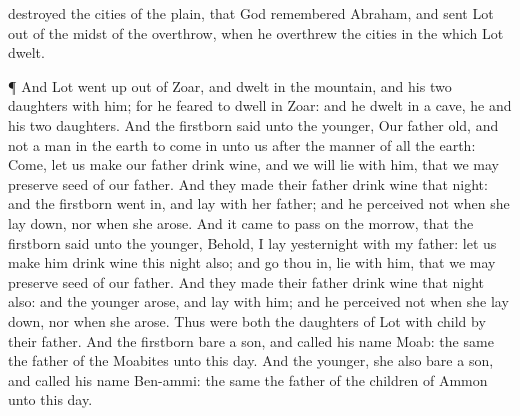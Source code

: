 {destroyed the
cities of the
plain, that
God
remembered
Abraham, and
sent
Lot out of the
midst of the
overthrow, when he
overthrew the
cities in the
which
Lot
dwelt.
\par }{\PP {}¶ And
Lot went
up out of
Zoar, and
dwelt in the
mountain, and his
two
daughters with him; for he
feared to
dwell in
Zoar: and he
dwelt in a
cave, he and his
two
daughters.
And the
firstborn
said unto the
younger, Our
father
{}
old, and
{} not a
man in the
earth to come
in unto us after the
manner of all the
earth:
Come, let us
make our
father
drink
wine, and we will
lie with him, that we may
preserve
seed of our
father.
And they
made their
father
drink
wine that
night: and the
firstborn went
in, and
lay with her
father; and he
perceived not when she lay
down, nor when she
arose.
And it came to pass on the
morrow, that the
firstborn
said unto the
younger, Behold, I
lay
yesternight with my
father: let us make him
drink
wine this
night also; and go thou
in,
{}
lie with him, that we may
preserve
seed of our
father.
And they
made their
father
drink
wine
that
night also: and the
younger
arose, and
lay with him; and he
perceived not when she lay
down, nor when she
arose.
Thus were
both the
daughters of
Lot with
child by their
father.
And the
firstborn
bare a
son, and
called his
name
Moab: the
same
{} the
father of the
Moabites unto this
day.
And the
younger, she also
bare a
son, and
called his
name
Ben-ammi: the same
{} the
father of the
children of
Ammon unto this
day.

}
